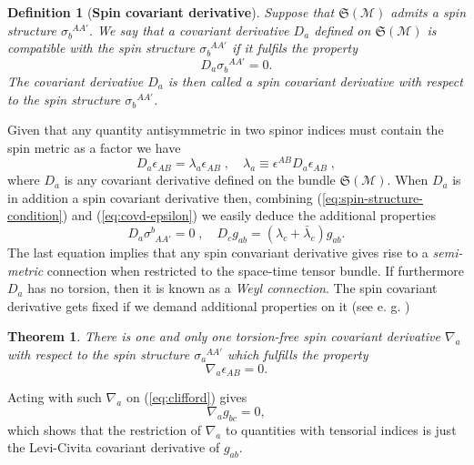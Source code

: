 \documentclass[final,3p,times,twocolumn]{elsarticle}
\newcounter{bla}
\newtheorem{theorem}{Theorem}
\newtheorem{definition}{Definition}
\begin{document}
\begin{definition}[\bf Spin covariant derivative]
Suppose that $\mathfrak{S}(\mathcal M)$ admits a spin structure 
$\sigma_{b}^{\phantom{b}AA'}$. We say that a covariant derivative $D_a$ defined on 
$\mathfrak{S}(\mathcal M)$ is compatible with the spin structure $\sigma_{b}^{\phantom{b}AA'}$ 
if it fulfils the property  
\begin{equation}
D_a\sigma_{b}^{\phantom{a}AA'}=0.
\label{eq:spin-structure-condition}
\end{equation}
The covariant derivative $D_a$ is then called a spin covariant derivative with respect to the spin structure $\sigma_{b}^{\phantom{a}AA'}$.
\label{def:spin-covd}
\end{definition}
Given that any quantity antisymmetric in two spinor indices must contain the spin metric as 
a factor we have 
\begin{equation}
D_a\epsilon_{AB}=\lambda_a\epsilon_{AB}\;,\quad 
\lambda_a\equiv\epsilon^{AB}D_a\epsilon_{AB}\;,
\label{eq:covd-epsilon}
\end{equation}
where $D_a$ is any covariant derivative defined on the bundle $\mathfrak{S}(\mathcal M)$.
When $D_a$ is in addition a spin covariant derivative then, combining (\ref{eq:spin-structure-condition}) and (\ref{eq:covd-epsilon}) we easily deduce the additional properties 
\begin{equation}
D_a\sigma^b_{\phantom{b}AA'}=0\;,\quad D_c g_{ab}=(\lambda_c+\bar\lambda_c)g_{ab}. 
\end{equation}
The last equation implies that any spin convariant derivative gives rise to a 
{\em semi-metric} connection \cite{SCHOUTEN} when restricted to the space-time tensor bundle. 
If furthermore $D_a$ has no torsion, then it is known as a {\em Weyl connection}.
The spin covariant derivative  
gets fixed if we demand additional properties on it (see e. g. \cite{PR-RINDLER-1}) 
\begin{theorem}
There is one and only one torsion-free spin covariant derivative 
$\nabla_a$ with respect to the spin structure 
$\sigma_{a}^{\phantom{a}AA'}$ which fulfills the property
\begin{equation}
\nabla_a\epsilon_{AB}=0.
\label{eq:cd-epsilon}
\end{equation}
\label{theorem:spincd-unique}
\end{theorem}
Acting with such $\nabla_a$ on (\ref{eq:clifford}) gives
\begin{equation}
\nabla_a g_{bc} = 0,
\label{eq:SpinLeviCivita}
\end{equation}
which shows that the restriction of $\nabla_a$ to quantities with tensorial
indices is just the Levi-Civita covariant derivative of $g_{ab}$.
\end{document}
